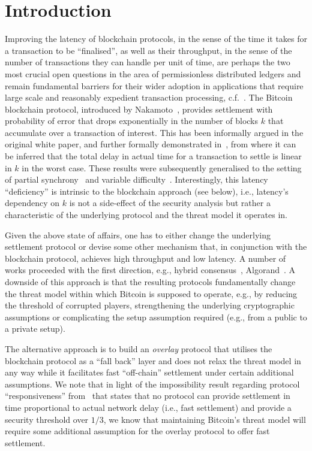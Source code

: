 
\section{Introduction}
\label{sec:intro}

Improving the latency of blockchain protocols, in the sense of the time it takes
for a transaction to be ``finalised'', as well as their throughput, in the sense
of the number of transactions they can handle per unit of time, are perhaps the
two most crucial open questions in the area of permissionless distributed
ledgers and remain fundamental barriers for their wider adoption in applications
that require large scale and reasonably expedient transaction processing,
c.f.~\cite{scaling}. The Bitcoin blockchain protocol, introduced by
Nakamoto~\cite{bitcoin}, provides settlement with probability of error that
drops exponentially in the number of blocks $k$ that accumulate over a
transaction of interest. This has been informally argued in the original white
paper, and further formally demonstrated in~\cite{gkl}, from where it can be
inferred that the total delay in actual time for a transaction to settle is
linear in $k$ in the worst case. These results were subsequently generalised to
the setting of partial synchrony~\cite{PSS16} and variable
difficulty~\cite{DBLP:conf/crypto/GarayKL17}. Interestingly, this latency
``deficiency'' is intrinsic to the blockchain approach (see below), i.e.,
latency's dependency on $k$ is not a side-effect of the security analysis but
rather a characteristic of the underlying protocol and the threat model it
operates in.

Given the above state of affairs, one has to either change the underlying
settlement protocol or devise some other mechanism that, in conjunction with the
blockchain protocol, achieves high throughput and low latency. A number of works
proceeded with the first direction, e.g., hybrid
consensus~\cite{DBLP:conf/wdag/PassS17},
Algorand~\cite{DBLP:journals/corr/Micali16}. A downside of this approach is that
the resulting protocols fundamentally change the threat model within which
Bitcoin is supposed to operate, e.g., by reducing the threshold of corrupted
players, strengthening the underlying cryptographic assumptions or complicating
the setup assumption required (e.g., from a public to a private setup).

The alternative approach is to build an \emph{overlay} protocol that utilises
the blockchain protocol as a ``fall back'' layer and does not relax the threat
model in any way while it facilitates fast ``off-chain'' settlement under
certain additional assumptions.  We note that in light of the impossibility
result regarding protocol ``responsiveness'' from~\cite{DBLP:conf/wdag/PassS17}
that states that no protocol can provide settlement in time proportional to
actual network delay (i.e., fast settlement) and provide a security threshold
over $1/3$, we know that maintaining Bitcoin's threat model will require some
additional assumption for the overlay protocol to offer fast settlement.

